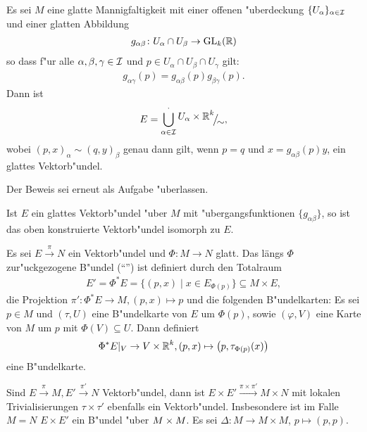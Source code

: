 \begin{Satz}\label{satz-5-2}
  Es sei $M$ eine glatte Mannigfaltigkeit mit einer offenen "uberdeckung $\{U_{\alpha}\}_{\alpha \in \operatorname{\mathcal{I}}}$ und einer glatten Abbildung
  \begin{align*}
    g_{\alpha\beta} \colon U_{\alpha} \cap U_{\beta} \to \operatorname{GL}_k(\operatorname{\mathbb{R}})
  \end{align*}
so dass f"ur alle $\alpha,\beta,\gamma \in \operatorname{\mathcal{I}}$ und $p \in U_{\alpha} \cap U_{\beta} \cap U_{\gamma}$ gilt:
\begin{align*}
  g_{\alpha\gamma} (p) = g_{\alpha\beta}(p)g_{\beta\gamma}(p).
\end{align*}
Dann ist
	\[ E = \bigcup_{\alpha \in \calI}^{\cdot} \FakRaum{U_{\alpha} \times \R^k}{\sim}, \]
wobei $(p,x)_{\alpha} \sim (q,y)_{\beta}$ genau dann gilt, wenn $p = q$ und $x = g_{\alpha\beta}(p)y$, ein glattes Vektorb"undel.
\end{Satz}

Der Beweis sei erneut als Aufgabe "uberlassen.

\begin{kor}
  Ist $E$ ein glattes Vektorb"undel "uber $M$ mit "ubergangsfunktionen $\{g_{\alpha\beta}\}$, so ist das oben konstruierte Vektorb"undel isomorph zu $E$.
\end{kor}

Es sei $E \xrightarrow{\pi} N$ ein Vektorb"undel und $\Phi \colon M \to N$ glatt.
Das längs $\Phi$ zur"uckgezogene B"undel ("`"') ist definiert durch den Totalraum
\begin{align*}
  E' = \Phi^{\ast}E = \{(p,x) \mid x \in E_{\Phi(p)}\} \subseteq M \times E,
\end{align*}
die Projektion $\pi' \colon \Phi^{\ast}E \to M, (p,x) \mapsto p$ und die folgenden B"undelkarten:
Es sei $p \in M$ und $(\tau, U)$ eine B"undelkarte von $E$ um $\Phi(p)$, sowie $(\varphi,V)$ eine Karte von $M$ um $p$ mit $\Phi(V) \subseteq U$.
Dann definiert 
\begin{align*}
  \Phi^{\ast}E|_V \to V \times \operatorname{\mathbb{R}}^k, (p,x) \mapsto \left(p, \tau_{\Phi(p)}(x)\right)
\end{align*}
eine B"undelkarte.

Sind $E \xrightarrow{\pi} M, E' \xrightarrow{\pi'} N$ Vektorb"undel, dann ist $E \times E' \xrightarrow{\pi \times \pi'} M \times N$ mit lokalen Trivialisierungen $\tau \times \tau'$ ebenfalls ein Vektorb"undel.
Insbesondere ist im Falle $M = N$ $E \times E'$ ein B"undel "uber $M \times M$.
Es sei $\Delta \colon M \to M \times M$, $p \mapsto (p,p)$.

